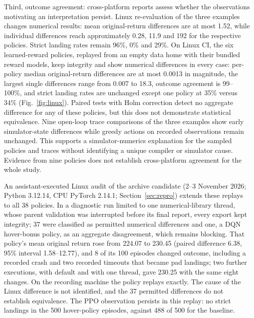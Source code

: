 \documentclass[preprint,12pt]{elsarticle}
\begin{document}
Third, outcome agreement: cross-platform reports assess whether the observations motivating an interpretation persist. Linux re-evaluation of the three examples changes numerical results: mean original-return differences are at most 1.52, while individual differences reach approximately 0.28, 11.9 and 192 for the respective policies. Strict landing rates remain 96\%, 0\% and 29\%. On Linux CI, the six learned-reward policies, replayed from an empty data home with their bundled reward models, keep integrity and show numerical differences in every case: per-policy median original-return differences are at most 0.0013 in magnitude, the largest single differences range from 0.007 to 18.3, outcome agreement is 99--100\%, and strict landing rates are unchanged except one policy at 35\% versus 34\% (Fig.~\ref{fig:linux}). Paired tests with Holm correction detect no aggregate difference for any of these policies, but this does not demonstrate statistical equivalence. Nine open-loop trace comparisons of the three examples show early simulator-state differences while greedy actions on recorded observations remain unchanged. This supports a simulator-numerics explanation for the sampled policies and traces without identifying a unique compiler or simulator cause. Evidence from nine policies does not establish cross-platform agreement for the whole study.

An assistant-executed Linux audit of the archive candidate (2--3 November 2026; Python 3.12.14, CPU PyTorch 2.14.1; Section~\ref{sec:repro}) extends these replays to all 38 policies. In a diagnostic run limited to one numerical-library thread, whose parent validation was interrupted before its final report, every export kept integrity; 37 were classified as permitted numerical differences and one, a DQN hover-bonus policy, as an aggregate disagreement, which remains blocking. That policy's mean original return rose from 224.07 to 230.45 (paired difference 6.38, 95\% interval 1.58--12.77), and 8 of its 100 episodes changed outcome, including a recorded crash and two recorded timeouts that became pad landings; two further executions, with default and with one thread, gave 230.25 with the same eight changes. On the recording machine the policy replays exactly. The cause of the Linux difference is not identified, and the 37 permitted differences do not establish equivalence. The PPO observation persists in this replay: no strict landings in the 500 hover-policy episodes, against 488 of 500 for the baseline.
\end{document}
